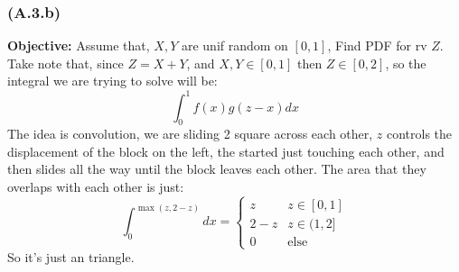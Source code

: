 \documentclass[]{article}
\begin{document}
        \subsubsection*{(A.3.b)}
            \textbf{Objective: } Assume that, $X,Y$ are unif random on $[0, 1]$, Find PDF for rv $Z$. 
            \\
            Take note that, since $Z = X + Y$, and $X, Y\in [0, 1]$ then $Z \in [0, 2]$, so the integral we are trying to solve will be: 
            \begin{equation*}\tag{1.3.b.1}\label{eqn:1.3.b.1}
                \int_{0}^{1} f(x)g(z - x)dx
            \end{equation*}
            The idea is convolution, we are sliding 2 square across each other, $z$ controls the displacement of the block on the left, the started just touching each other, and then slides all the way until the block leaves each other. The area that they overlaps with each other is just: 
            \begin{equation*}\tag{1.3.b.2}\label{eqn:1.3.b.2}
                \int_{0}^{\max(z, 2 - z)}dx
                =
                \begin{cases}
                    z & z\in [0, 1]
                    \\
                    2 - z & z\in (1, 2]
                    \\
                    0 & \text{else}
                \end{cases}
            \end{equation*}
            So it's just an triangle. 
\end{document}
